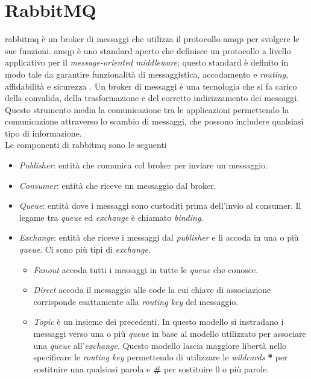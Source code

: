 \section{RabbitMQ}\label{rabbitmq}

\Gls{rabbitmq} è un broker di messaggi che utilizza il protocollo \acrshort{amqp} per svolgere le sue funzioni. \acrshort{amqp} è uno standard aperto che definisce un protocollo a livello applicativo per il \textit{message-oriented middleware}; questo standard è definito in modo tale da garantire funzionalità di messaggistica, accodamento e \textit{routing}, affidabilità e sicurezza \cite{amqprab}. Un broker di messaggi è una tecnologia che si fa carico della convalida, della trasformazione e del corretto indirizzamento dei messaggi. Questo strumento media la comunicazione tra le applicazioni permettendo la comunicazione attraverso lo scambio di messaggi, che possono includere qualsiasi tipo di informazione.\\
Le componenti di \Gls{rabbitmq} sono le seguenti
\begin{itemize}
    \item \textit{Publisher}: entità che comunica col broker per inviare un messaggio.
    \item \textit{Consumer}: entità che riceve un messaggio dal broker.
    \item \textit{Queue}: entità dove i messaggi sono custoditi prima dell'invio al consumer. Il legame tra \textit{queue} ed \textit{exchange} è chiamato \textit{binding}.
    \item \textit{Exchange}: entità che riceve i messaggi dal \textit{publisher} e li accoda in una o più \textit{queue}. Ci sono più tipi di \textit{exchange}.
    \begin{itemize}
        \item \textit{Fanout} accoda tutti i messaggi in tutte le \textit{queue} che conosce.
        \item \textit{Direct} accoda il messaggio alle code la cui chiave di associazione corrisponde esattamente alla \textit{routing key} del messaggio.
        \item \textit{Topic} è un insieme dei precedenti. In questo modello si instradano i messaggi verso una o più \textit{queue} in base al modello utilizzato per associare una \textit{queue} all'\textit{exchange}. Questo modello lascia maggiore libertà nello specificare le \textit{routing key} permettendo di utilizzare le \textit{wildcards} \textbf{*} per sostituire una qualsiasi parola e \textbf{\#} per sostituire 0 o più parole.
    \end{itemize}
\end{itemize}
